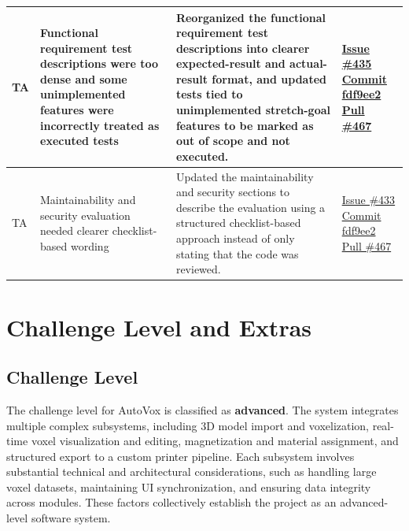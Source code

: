 \documentclass[12pt, titlepage]{article}
\begin{document}
\begin{longtable}{|p{2cm}|p{4cm}|p{5cm}|p{3cm}|}
TA & Functional requirement test descriptions were too dense and some unimplemented features were incorrectly treated as executed tests & Reorganized the functional requirement test descriptions into clearer expected-result and actual-result format, and updated tests tied to unimplemented stretch-goal features to be marked as out of scope and not executed. & \href{https://github.com/OmarHassanAdelhamid/Five-of-a-Kind-capstone-project-/issues/435}{Issue \#435}
\newline\href{https://github.com/OmarHassanAdelhamid/Five-of-a-Kind-capstone-project-/commit/fdf9ee2}{Commit fdf9ee2}
\newline\href{https://github.com/OmarHassanAdelhamid/Five-of-a-Kind-capstone-project-/pull/467}{Pull \#467} \\ \hline

TA & Maintainability and security evaluation needed clearer checklist-based wording & Updated the maintainability and security sections to describe the evaluation using a structured checklist-based approach instead of only stating that the code was reviewed. & \href{https://github.com/OmarHassanAdelhamid/Five-of-a-Kind-capstone-project-/issues/433}{Issue \#433}
\newline\href{https://github.com/OmarHassanAdelhamid/Five-of-a-Kind-capstone-project-/commit/fdf9ee2}{Commit fdf9ee2}
\newline\href{https://github.com/OmarHassanAdelhamid/Five-of-a-Kind-capstone-project-/pull/467}{Pull \#467} \\ \hline
\end{longtable}

\section{Challenge Level and Extras}

\subsection{Challenge Level}

The challenge level for AutoVox is classified as \textbf{advanced}. The system integrates
multiple complex subsystems, including 3D model import and voxelization, real-
time voxel visualization and editing, magnetization and material assignment, and
structured export to a custom printer pipeline. Each subsystem involves substantial
technical and architectural considerations, such as handling large voxel datasets,
maintaining UI synchronization, and ensuring data integrity across modules. These
factors collectively establish the project as an advanced-level software system.
\end{document}
